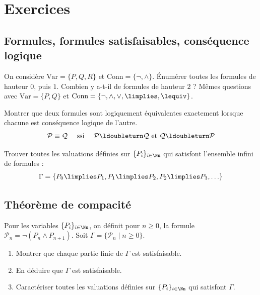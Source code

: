 \documentclass[11pt,class=report,crop=false]{standalone}
\begin{document}
\section*{Exercices}

\subsection*{Formules, formules satisfaisables, conséquence logique}


\begin{exercicecours}
	On considère $\text{Var} = \{P,Q,R\}$ et $\text{Conn} = \{ \lnot, \land\}$.
	Énumérer toutes les formules de hauteur $0$, puis $1$. 
	Combien y a-t-il de formules de hauteur $2$ ?
	Mêmes questions avec $\text{Var} = \{P,Q\}$ et $\text{Conn} = \{ \lnot, \land, \lor, \limplies, \lequiv \}$.
\end{exercicecours}


\begin{exercicecours}
	Montrer que deux formules sont logiquement équivalentes
	exactement lorsque chacune est conséquence logique de l'autre.
	\[ 
	\mathcal{P} \equiv \mathcal{Q} 
	\quad  \text{ ssi }  \quad
	\mathcal{P} \ldoubleturn \mathcal{Q} \text{ et } \mathcal{Q} \ldoubleturn \mathcal{P}
	\]
\end{exercicecours}


\begin{exercicecours}
	Trouver toutes les valuations définies sur $\{ P_i \}_{i \in\Nn}$ qui satisfont l'ensemble infini de formules :
	\[
	\Gamma = 
	\{ P_0 \limplies P_1, P_1 \limplies P_2, P_2 \limplies P_3, \ldots \}
	\] 
\end{exercicecours}



\subsection*{Théorème de compacité}

\begin{exercicecours}
	Pour les variables $\{ P_i \}_{i \in \Nn}$, on définit pour $n \ge 0$, la formule
	$\mathcal{P}_n = \lnot (P_n \land P_{n+1})$.
	Soit $\Gamma = \{ \mathcal{P}_n \mid n \ge 0\}$.
	
	\begin{enumerate}
		\item Montrer que chaque partie finie de $\Gamma$ est satisfaisable.
		
		\item En déduire que $\Gamma$ est satisfaisable.
		
		\item Caractériser toutes les valuations définies sur $\{ P_i \}_{i \in\Nn}$ qui satisfont $\Gamma$.
	\end{enumerate}	
\end{exercicecours}
\end{document}
